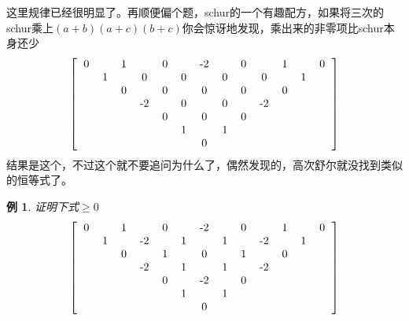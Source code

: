 \documentclass[UTF8]{ctexart}
\newtheorem{1}{例}
\begin{document}
这里规律已经很明显了。再顺便偏个题，schur的一个有趣配方，如果将三次的schur乘上$ (a+b)(a+c)(b+c) $你会惊讶地发现，乘出来的非零项比schur本身还少
\renewcommand*{\arraystretch}{1.732}\[\left[\begin{matrix}
	\begin{tabular}{ccccccccccccc}
		0& &1& &0& &-2& &0& &1& &0\\
		&1& &0& &0& &0& &0& &1&\\
		& &0& &0& &0& &0& &0& &\\
		& & &-2& &0& &0& &-2& & &\\
		& & & &0& &0& &0& & & &\\
		& & & & &1& &1& & & & &\\
		& & & & & &0& & & & & &\\
	\end{tabular}
\end{matrix}\right]\]
结果是这个，不过这个就不要追问为什么了，偶然发现的，高次舒尔就没找到类似的恒等式了。
\begin{1}

证明下式$ \geq 0 $\\
\renewcommand*{\arraystretch}{1.732}\[\left[\begin{matrix}
	\begin{tabular}{ccccccccccccc}
		0&  &1  &  & 0 &  & -2 &  & 0 &  & 1 &  & 0\\
		&1  &  & -2 &  & 1 &  & 1 &  & -2 &  & 1 & \\
		&  & 0 &  & 1 &  &  0&  &  1&  &  0&  & \\
		&  &  &  -2 &  & 1 &  & 1 &  & -2  &  &  & \\
		&  &  &  &  0&  &-2  &  & 0 &  &  &  & \\
		&  &  &  &  &  1&  &1  &  &  &  &  & \\
		&  &  &  &  &  &  0&  &  &  &  &  & \\
	\end{tabular}
\end{matrix}\right]\]
\end{1}
\end{document}
